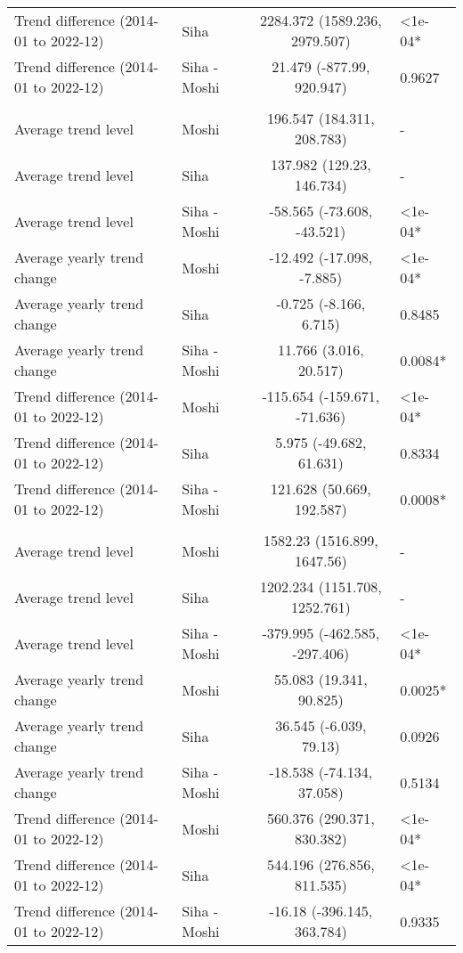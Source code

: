 \begin{longtable}{l|lcl}
Trend difference (2014-01 to 2022-12) & Siha & 2284.372 (1589.236, 2979.507) & <1e-04* \\ 
Trend difference (2014-01 to 2022-12) & Siha - Moshi & 21.479 (-877.99, 920.947) & 0.9627 \\ 
\midrule\addlinespace[2.5pt]
\multicolumn{4}{l}{Trauma} \\[2.5pt] 
\midrule\addlinespace[2.5pt]
Average trend level & Moshi & 196.547 (184.311, 208.783) & - \\ 
Average trend level & Siha & 137.982 (129.23, 146.734) & - \\ 
Average trend level & Siha - Moshi & -58.565 (-73.608, -43.521) & <1e-04* \\ 
Average yearly trend change & Moshi & -12.492 (-17.098, -7.885) & <1e-04* \\ 
Average yearly trend change & Siha & -0.725 (-8.166, 6.715) & 0.8485 \\ 
Average yearly trend change & Siha - Moshi & 11.766 (3.016, 20.517) & 0.0084* \\ 
Trend difference (2014-01 to 2022-12) & Moshi & -115.654 (-159.671, -71.636) & <1e-04* \\ 
Trend difference (2014-01 to 2022-12) & Siha & 5.975 (-49.682, 61.631) & 0.8334 \\ 
Trend difference (2014-01 to 2022-12) & Siha - Moshi & 121.628 (50.669, 192.587) & 0.0008* \\ 
\midrule\addlinespace[2.5pt]
\multicolumn{4}{l}{Urinary Infections} \\[2.5pt] 
\midrule\addlinespace[2.5pt]
Average trend level & Moshi & 1582.23 (1516.899, 1647.56) & - \\ 
Average trend level & Siha & 1202.234 (1151.708, 1252.761) & - \\ 
Average trend level & Siha - Moshi & -379.995 (-462.585, -297.406) & <1e-04* \\ 
Average yearly trend change & Moshi & 55.083 (19.341, 90.825) & 0.0025* \\ 
Average yearly trend change & Siha & 36.545 (-6.039, 79.13) & 0.0926 \\ 
Average yearly trend change & Siha - Moshi & -18.538 (-74.134, 37.058) & 0.5134 \\ 
Trend difference (2014-01 to 2022-12) & Moshi & 560.376 (290.371, 830.382) & <1e-04* \\ 
Trend difference (2014-01 to 2022-12) & Siha & 544.196 (276.856, 811.535) & <1e-04* \\ 
Trend difference (2014-01 to 2022-12) & Siha - Moshi & -16.18 (-396.145, 363.784) & 0.9335 \\ 

\end{longtable}
